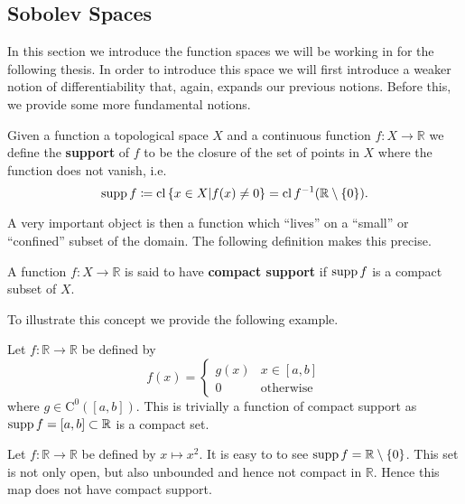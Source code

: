 \subsection{Sobolev Spaces}\label{subsec:weakds}
In this section we introduce the function spaces we will be working in for the
following thesis. In order to introduce this space we will first introduce a
weaker notion of differentiability that, again, expands our previous notions.
Before this, we provide some more fundamental notions.
\begin{definition}
    Given a function a topological space \(X\) and a continuous function
    \(f:X\to\mathbb{R}\) we define the \textbf{support} of \(f\) to be the
    closure of the set of points in \(X\) where the function does not vanish, i.e.
    \begin{equation}
        \operatorname{supp}{f}\coloneqq \operatorname{cl}{\{x\in X | f(x) \neq 0\}} = \operatorname{cl}{f^{-1}(\mathbb{R}\setminus\{0\})}.
    \end{equation}
\end{definition}
A very important object is then a function which ``lives'' on a ``small'' or
``confined'' subset of the domain. The following definition makes this precise.
\begin{definition}
    A function \(f:X\to\mathbb{R}\) is said to have \textbf{compact support} if
    \(\operatorname{supp}{f}\) is a compact subset of \(X\).
\end{definition}
To illustrate this concept we provide the following example.
\begin{example}
    Let \(f:\mathbb{R}\to\mathbb{R}\) be defined by
    \begin{equation}
        f(x) = \begin{cases}
            g(x) & x\in[a,b] \\
            0    & \text{otherwise}
        \end{cases}
    \end{equation}
    where \(g\in\mathrm{C}^0([a,b])\). This is trivially a function of compact
    support as \(\operatorname{supp}{f} = [a,b]\subset\mathbb{R}\) is a compact set.
\end{example}

\begin{example}
    Let \(f:\mathbb{R}\to\mathbb{R}\) be defined by \(x\mapsto x^2\). It is easy
    to to see \(\operatorname{supp}{f} = \mathbb{R}\setminus \{0\}\). This set is not only
    open, but also unbounded and hence not compact in \(\mathbb{R}\). Hence this
    map does not have compact support.
\end{example}

